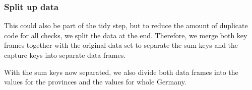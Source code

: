 \documentclass[
]{article}
\newenvironment{Shaded}{\begin{snugshade}}{\end{snugshade}}
\newcommand{\KeywordTok}[1]{\textcolor[rgb]{0.13,0.29,0.53}{\textbf{#1}}}
\newcommand{\NormalTok}[1]{#1}
\newcommand{\OperatorTok}[1]{\textcolor[rgb]{0.81,0.36,0.00}{\textbf{#1}}}
\newcommand{\StringTok}[1]{\textcolor[rgb]{0.31,0.60,0.02}{#1}}
\begin{document}
\hypertarget{split-up-data}{%
\subsubsection{Split up data}\label{split-up-data}}

This could also be part of the tidy step, but to reduce the amount of
duplicate code for all checks, we split the data at the end. Therefore,
we merge both key frames together with the original data set to separate
the sum keys and the capture keys into separate data frames.

\begin{Shaded}
\end{Shaded}

With the sum keys now separated, we also divide both data frames into
the values for the provinces and the values for whole Germany.

\begin{Shaded}
\end{Shaded}
\end{document}
